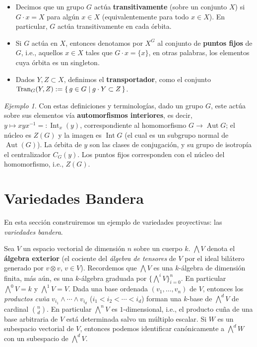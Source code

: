 \documentclass[spanish,10pt]{amsart}
\theoremstyle{definition}
\theoremstyle{remark}
\newtheorem{example}[theorem]{Ejemplo}
\numberwithin{equation}{section}
\begin{document}
\begin{itemize}
\item Decimos que un grupo $G$ actúa \textbf{transitivamente} (sobre un conjunto $X$) si $G \cdot x = X$ para algún $x \in X$ (equivalentemente para todo $x \in X$). En particular, $G$ actúa transitivamente en cada órbita.
\item Si $G$ actúa en $X$, entonces denotamos por $X^{G}$ al conjunto de \textbf{puntos fijos} de $G$, i.e., aquellos $x \in X$ tales que $G \cdot x = \{x\}$, en otras palabras, los elementos cuya órbita es un singleton.
\item Dados $Y,Z \subset X$, definimos el \textbf{transportador}, como el conjunto $\operatorname{Tran}_G (Y, Z) := \set{g \in G | g \cdot Y \subset Z}$.
\end{itemize}

\begin{example}
Con estas definiciones y terminologías, dado un grupo $G$, este actúa sobre sus elementos vía \textbf{automorfismos interiores}, es decir, $y \mapsto x y x^{-1} =: \operatorname{Int}_x (y)$, correspondiente al homomorfismo $G \to \operatorname{Aut}G$; el núcleo es $Z(G)$ y la imagen es $\operatorname{Int} G$ (el cual es un subgrupo normal de $\operatorname{Aut} (G)$). La órbita de $y$ son las clases de conjugación, y su grupo de isotropía el centralizador $C_G (y)$. Los puntos fijos corresponden con el núcleo del homomorfismo, i.e., $Z(G)$.
\end{example}


\section{Variedades Bandera}

En esta sección construiremos un ejemplo de variedades proyectivas: las \textit{variedades bandera}.

Sea $V$ un espacio vectorial de dimensión $n$ sobre un cuerpo $k$. $\bigwedge V$ denota el \textbf{álgebra exterior} (el cociente del \textit{álgebra de tensores} de $V$ por el ideal bilátero generado por $v \otimes v$, $v \in V$). Recordemos que $\bigwedge V$ es una $k$-álgebra de dimensión finita, más aún, es una $k$-álgebra graduada por $\{\bigwedge^i V\}_{i = 0}^n$. En particular $\bigwedge^0 V = k$ y $\bigwedge^1 V = V$. Dada una base ordenada $(v_1, \ldots, v_n)$ de $V$, entonces los \textit{productos cuña} $v_{i_1} \wedge \cdots \wedge v_{i_d}$ ($i_1 < i_2 < \cdots < i_d$) forman una $k$-base de $\bigwedge^d V$ de cardinal $\binom n d$. En particular $\bigwedge^n V$ es $1$-dimensional, i.e., el producto cuña de una base arbitraria de $V$ está determinada salvo un múltiplo escalar. Si $W$ es un subespacio vectorial de $V$, entonces podemos identificar canónicamente a $\bigwedge^d W$ con un subespacio de $\bigwedge^d V$.
\end{document}
